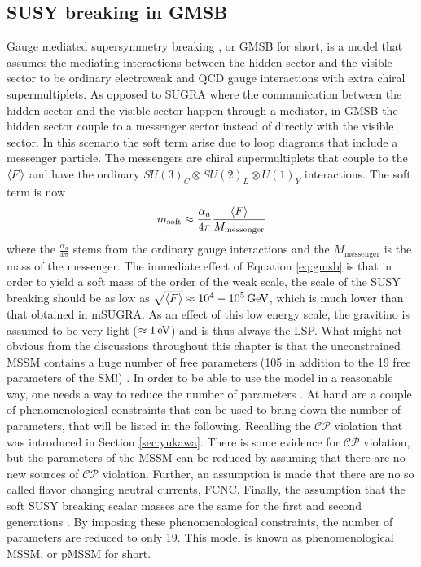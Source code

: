 \subsection*{SUSY breaking in GMSB}
\noindent\justify
Gauge mediated supersymmetry breaking \cite{Dine:1981gu,Nappi:1982hm,Dine:248065}, or GMSB for short, is a model that assumes the mediating interactions between the hidden sector and the visible sector to be ordinary electroweak and QCD gauge interactions with extra chiral supermultiplets. 
As opposed to SUGRA where the communication between the hidden sector and the visible sector happen through a mediator, in GMSB the hidden sector couple to a messenger sector instead of directly with the visible sector.
In this scenario the soft term arise due to loop diagrams that include a messenger particle. 
The messengers are chiral supermultiplets that couple to the $\braket{F}$ and have the ordinary $SU(3)_{C}\otimes SU(2)_{L}\otimes U(1)_{Y}$ interactions. 
The soft term is now
\begin{equation}
m_{\mathrm{soft}}\approx\frac{\alpha_{a}}{4\pi}\frac{\braket{F}}{M_{\mathrm{messenger}}}
\label{eq:gmsb}
\end{equation}
where the $\frac{\alpha_{a}}{4\pi}$ stems from the ordinary gauge interactions and the $M_{\mathrm{messenger}}$ is the mass of the messenger. 
The immediate effect of Equation \ref{eq:gmsb} is that in order to yield a soft mass of the order of the weak scale, the scale of the SUSY breaking should be as low as $\sqrt{\braket{F}}\approx10^{4}-10^{5}\,\text{Ge\hspace{-.08em}V}$, which is much lower than that obtained in mSUGRA.
As an effect of this low energy scale, the gravitino is assumed to be very light ($\approx1\,\text{e\hspace{-.08em}V}$) and is thus always the LSP. 
\newpara
\noindent\justify
What might not obvious from the discussions throughout this chapter is that the unconstrained MSSM contains a huge number of free parameters (105 in addition to the 19 free parameters of the SM!) \cite{Dimopoulos:1995ju}.
In order to be able to use the model in a reasonable way, one needs a way to reduce the number of parameters \cite{Djouadi:1998di}. 
At hand are a couple of phenomenological constraints that can be used to bring down the number of parameters, that will be listed in the following. 
Recalling the $\mathcal{CP}$ violation that was introduced in Section \ref{sec:yukawa}. 
There is some evidence for $\mathcal{CP}$ violation, but the parameters of the MSSM can be reduced by assuming that there are no new sources of $\mathcal{CP}$ violation.  
Further, an assumption is made that there are no so called flavor changing neutral currents, FCNC. 
Finally, the assumption that the soft SUSY breaking scalar masses are the same for the first and second generations \cite{Djouadi:1998di}.
By imposing these phenomenological constraints, the number of parameters are reduced to only 19. 
This model is known as phenomenological MSSM, or pMSSM for short.  
